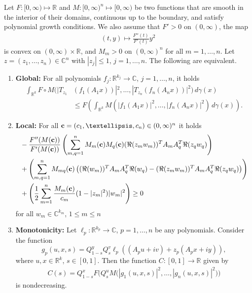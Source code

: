 \documentclass[10pt,a4paper]{amsart}
\newcommand{\C}{\mathbb{C}}
\newcommand{\R}{\mathbb{R}}
\begin{document}
\begin{proposition}\label{equivalComplex}
Let $F :[0,\infty) \mapsto \mathbb{R}$ and $M: [0,\infty)^{n} \mapsto [0,\infty)$ be two functions that are smooth in the interior of their domains, continuous up to the boundary,  and satisfy polynomial growth conditions. We also assume that $F'>0$ on $(0,\infty)$, the map 
\begin{align}\label{lemmaConvF}
(t,y) \mapsto \frac{F''(t)}{F'(t)}y^{2}
\end{align}
is convex on $(0,\infty)\times \mathbb{R}$, and 
 $M_{m}>0$ on $(0, \infty)^{n}$ for all $m=1, \ldots, n$.    Let $z=(z_{1}, \ldots, z_{n}) \in \mathbb{C}^{n}$ with $|z_{j}|\leq 1$, $j=1, \ldots, n$. The following are equivalent.
\vspace{0.2cm}
\begin{enumerate}
\item \label{Globalcomplex} \textbf{Global:} For all polynomials $f_j:\R^{k_j}\to\C$, $j=1, \ldots, n$,  it holds
\vspace{0.2cm}
\begin{align*}
\int_{\R^k}F\circ M(|T_{z_1}&(f_1(A_1 x))|^2, \ldots, |T_{z_n}(f_n( A_n x))|^2) \,d\gamma(x)\\
&\leq F\left(	\int_{\R^k}M(|f_1(A_1 x)|^2, \ldots, |f_n(A_n x)|^2)\,d\gamma(x)\right).
\end{align*}  
\vspace{0.2cm}
\item \label{Localcomplex}\textbf{Local:}  For all ${\bf{c}}=(c_{1},\ldots, c_{n})\in (0,\infty)^n$ it holds
\vspace{0.2cm}
\begin{align*}
		&-\frac{F''(M({\bf{c}}))}{F'(M({\bf{c}}))}\left(\sum_{m, q=1}^{n} M_{m}({\bf{c}})M_{q}({\bf{c}})  (\Re(z_mw_{m}))^T A_{m} A_{q}^T  \Re(z_qw_{q}) \right)\\
		&+\left(\sum_{m, q=1}^{n}  M_{mq}({\bf{c}}) \left( (\Re(w_{m}))^T A_{m} A_{q}^T  \Re(w_{q})  -  (\Re(z_mw_{m}))^T A_{m} A_{q}^T  \Re(z_qw_{q}) \right) \right)\\
		&+\left(\frac{1}{2}\sum_{m=1}^n\frac{M_{m}({\bf{c}})}{c_m}(1-|z_m|^2) 
		|w_{m}|^2\right)\geq0
	\end{align*}
	for all $w_{m}\in\C^{k_m}$, $1\leq m\leq n$
\vspace{0.2cm}
\item \label{monotonicitycomplex} \textbf{Monotonicity:} Let $\ell_p:\R^{k_p}\to\mathbb{C}$, $p=1,\ldots,n$ be any polynomials. Consider the function 
\begin{equation}\label{gforComplex}
g_p(u,x,s)=Q_{1-s}^yQ_s^v\ell_p((A_p u+iv)+z_p(A_p x+iy)),
\end{equation}
where $u,x\in\R^k$, $s\in[0,1]$. Then the function $C:[0,1]\to \R$ given by 
\begin{align}\label{4Hflows}
C(s)=Q_{1-s}^x F\big(Q_s^uM\big(|g_1(u,x,s)|^2,\ldots,|g_n(u,x,s)|^2)\big)
\end{align}
is nondecreasing. 
\vspace{0.2cm}
\end{enumerate} 
\end{proposition}	
\end{document}
